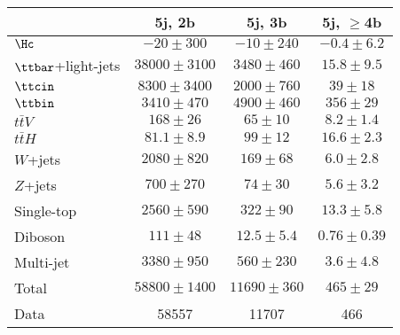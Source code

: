 \begin{table}[htbp]
\begin{center}
\begin{tabular}{l*{3}{c}}
\hline\hline
 & 5j, 2b & 5j, 3b & 5j, $\geq$4b \\
\hline
$\Hc$  &   $ -20 \pm 300 $ &   $ -10 \pm 240 $ &   $ -0.4 \pm 6.2 $ \\ 
\hline
$\ttbar$+light-jets  &   $ 38000 \pm 3100 $ &   $ 3480 \pm 460 $ &   $ 15.8 \pm 9.5 $ \\ 
$\ttcin$  &   $ 8300 \pm 3400 $ &   $ 2000 \pm 760 $ &   $ 39 \pm 18 $ \\ 
$\ttbin$  &   $ 3410 \pm 470 $ &   $ 4900 \pm 460 $ &   $ 356 \pm 29 $ \\ 
$t\bar{t}V$  &   $ 168 \pm 26 $ &   $ 65 \pm 10 $ &   $ 8.2 \pm 1.4 $ \\ 
$t\bar{t}H$  &   $ 81.1 \pm 8.9 $ &   $ 99 \pm 12 $ &   $ 16.6 \pm 2.3 $ \\ 
$W$+jets  &   $ 2080 \pm 820 $ &   $ 169 \pm 68 $ &   $ 6.0 \pm 2.8 $ \\ 
$Z$+jets  &   $ 700 \pm 270 $ &   $ 74 \pm 30 $ &   $ 5.6 \pm 3.2 $ \\ 
Single-top  &   $ 2560 \pm 590 $ &   $ 322 \pm 90 $ &   $ 13.3 \pm 5.8 $ \\ 
Diboson  &   $ 111 \pm 48 $ &   $ 12.5 \pm 5.4 $ &   $ 0.76 \pm 0.39 $ \\ 
Multi-jet  &   $ 3380 \pm 950 $ &   $ 560 \pm 230 $ &   $ 3.6 \pm 4.8 $ \\ 
\hline
Total & $ 58800 \pm 1400 $ &   $ 11690 \pm 360 $ &   $ 465 \pm 29 $ \\ 
\hline
Data & 58557  & 11707  & 466  \\ 
\hline\hline      
\end{tabular}
\vspace{0.2cm}


\end{center}
\end{table}
